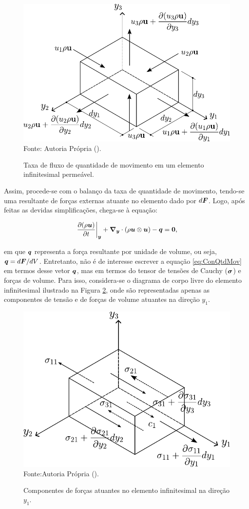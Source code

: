 \begin{figure}[h!]
    \centering
    \caption{Taxa de fluxo de quantidade de movimento em um elemento infinitesimal permeável.}
    \includegraphics[width=.55\linewidth]{Figuras/ConQtdMov.pdf}
    \\Fonte: Autoria Própria (\the\year).
    \label{fig:ConQtdMov}
\end{figure}

Assim, procede-se com o balanço da taxa de quantidade de movimento, tendo-se uma resultante de forças externas atuante no elemento dado por $d\boldsymbol{F}$. Logo, após feitas as devidas simplificações, chega-se à equação:

\begin{equation}
    \left.\frac{\partial{(\rho \boldsymbol{u})}}{\partial{t}}\right|_{\boldsymbol{y}}+\boldsymbol{\nabla_y}\cdot(\rho \boldsymbol{u}\otimes\boldsymbol{u})-\boldsymbol{q}=\boldsymbol{0}\text{,}
    \label{eq:ConQtdMov}
\end{equation}

\noindent em que $\boldsymbol{q}$ representa a força resultante por unidade de volume, ou seja, $\boldsymbol{q}=d\boldsymbol{F}/dV$. Entretanto, não é de interesse escrever a equação \eqref{eq:ConQtdMov} em termos desse vetor $\boldsymbol{q}$, mas em termos do tensor de tensões de Cauchy ($\boldsymbol{\sigma}$) e forças de volume. Para isso, considera-se o diagrama de corpo livre do elemento infinitesimal ilustrado na Figura \ref{fig:EqFor}, onde são representadas apenas as componentes de tensão e de forças de volume atuantes na direção $y_1$.

\begin{figure}[h!]
    \centering
    \caption{Componentes de forças atuantes no elemento infinitesimal na direção $y_1$.}
    \includegraphics[width=.5\linewidth]{Figuras/EqFor.pdf}
    \\Fonte:Autoria Própria (\the\year).
    \label{fig:EqFor}
\end{figure}

